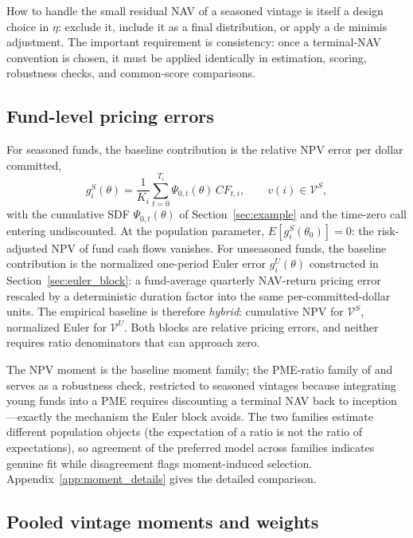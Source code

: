 \documentclass[11pt]{article}
\begin{document}
How to handle the small residual NAV of a seasoned vintage is itself a design choice in \(\eta\): exclude it, include it as a final distribution, or apply a de minimis adjustment. The important requirement is consistency: once a terminal-NAV convention is chosen, it must be applied identically in estimation, scoring, robustness checks, and common-score comparisons.

\subsection{Fund-level pricing errors}
\label{sec:fund_moments}

For seasoned funds, the baseline contribution is the relative NPV error per dollar committed,
\[
g_i^S(\theta)=\frac{1}{K_i}\sum_{t=0}^{T_i}\Psi_{0,t}(\theta)\,CF_{t,i},
\qquad v(i)\in\mathcal V^S,
\]
with the cumulative SDF \(\Psi_{0,t}(\theta)\) of Section~\ref{sec:example} and the time-zero call entering undiscounted. At the population parameter, \(E[g_i^S(\theta_0)]=0\): the risk-adjusted NPV of fund cash flows vanishes. For unseasoned funds, the baseline contribution is the normalized one-period Euler error \(g_i^U(\theta)\) constructed in Section~\ref{sec:euler_block}: a fund-average quarterly NAV-return pricing error rescaled by a deterministic duration factor into the same per-committed-dollar units. The empirical baseline is therefore \emph{hybrid}: cumulative NPV for \(\mathcal V^S\), normalized Euler for \(\mathcal V^U\). Both blocks are relative pricing errors, and neither requires ratio denominators that can approach zero.

The NPV moment is the baseline moment family; the PME-ratio family of \citet{KaplanSchoar2005} and \citet{AngChenGoetzmannPhalippou2018} serves as a robustness check, restricted to seasoned vintages because integrating young funds into a PME requires discounting a terminal NAV back to inception---exactly the mechanism the Euler block avoids. The two families estimate different population objects (the expectation of a ratio is not the ratio of expectations), so agreement of the preferred model across families indicates genuine fit while disagreement flags moment-induced selection. Appendix~\ref{app:moment_details} gives the detailed comparison.

\subsection{Pooled vintage moments and weights}
\label{sec:vintage_moments}
\end{document}
